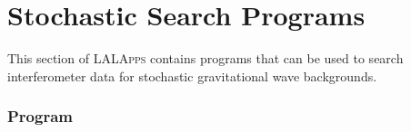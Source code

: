 
\chapter{Stochastic Search Programs}
\label{chapter:stochastic}

This section of \textsc{LALApps} contains programs that can be used to
search interferometer data for stochastic gravitational wave
backgrounds.

\clearpage


\clearpage
\subsection{Program }
\label{program:stochastic-pipeline}


